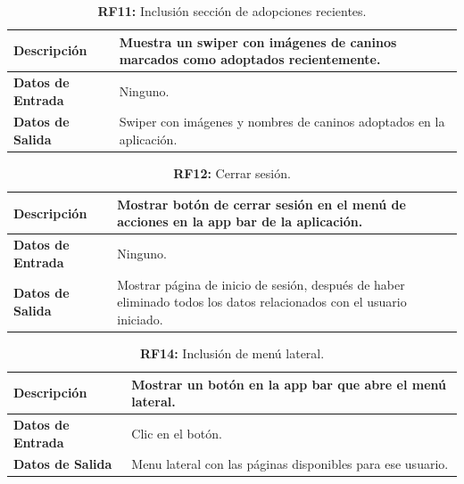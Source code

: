 \documentclass[a4paper, 12pt]{article}
\begin{document}
\begin{table}[H]
\captionsetup{list=no}%
\captionsetup{justification=raggedright,singlelinecheck=false}
\captionsetup{labelformat=empty}
\caption{\textbf{RF11:} Inclusión sección de adopciones recientes.}
\label{tab:RF11}
	\begin{tabular}{|m{5cm}|m{10cm}|}
	\hline
	\textbf{Descripción} & Muestra un swiper con imágenes de caninos marcados como adoptados recientemente. \\ 
	\hline
	\textbf{Datos de Entrada} & Ninguno. \\ 
	\hline
	\textbf{Datos de Salida} & Swiper con imágenes y nombres de caninos adoptados en la aplicación. \\ 
	\hline
\end{tabular}
\end{table}

\begin{table}[H]
\captionsetup{list=no}%
\captionsetup{justification=raggedright,singlelinecheck=false}
\captionsetup{labelformat=empty}
\caption{\textbf{RF12:} Cerrar sesión.}
\label{tab:RF12}
	\begin{tabular}{|m{5cm}|m{10cm}|}
	\hline
	\textbf{Descripción} & Mostrar botón de cerrar sesión en el menú de acciones en la app bar de la aplicación. \\ 
	\hline
	\textbf{Datos de Entrada} & Ninguno. \\ 
	\hline
	\textbf{Datos de Salida} & Mostrar página de inicio de sesión, después de haber eliminado todos los datos relacionados con el usuario iniciado. \\ 
	\hline
\end{tabular}
\end{table}

\begin{table}[H]
\captionsetup{list=no}%
\captionsetup{justification=raggedright,singlelinecheck=false}
\captionsetup{labelformat=empty}
\caption{\textbf{RF14:} Inclusión de menú lateral.}
\label{tab:RF14}
	\begin{tabular}{|m{5cm}|m{10cm}|}
	\hline
	\textbf{Descripción} & Mostrar un botón en la app bar que abre el menú lateral. \\ 
	\hline
	\textbf{Datos de Entrada} & Clic en el botón. \\ 
	\hline
	\textbf{Datos de Salida} & Menu lateral con las páginas disponibles para ese usuario. \\ 
	\hline
\end{tabular}
\end{table}
\end{document}
